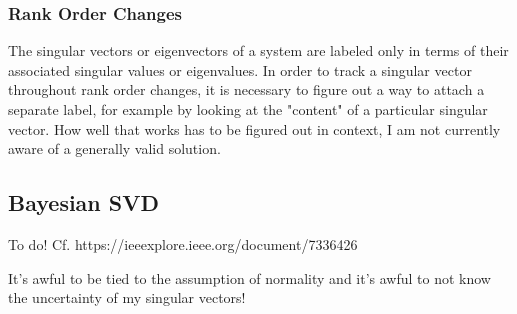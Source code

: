 \subsubsection{Rank Order Changes}

The singular vectors or eigenvectors of a system are labeled only in terms of their associated singular values or eigenvalues. In order to track a singular vector throughout rank order changes, it is necessary to figure out a way to attach a separate label, for example by looking at the "content" of a particular singular vector. How well that works has to be figured out in context, I am not currently aware of a generally valid solution. 


\subsection{Bayesian SVD}
To do! Cf. https://ieeexplore.ieee.org/document/7336426

It's awful to be tied to the assumption of normality and it's awful to not know the uncertainty of my singular vectors!